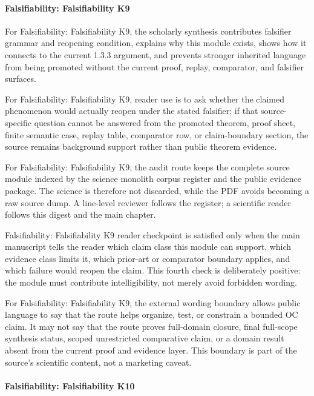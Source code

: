 \paragraph{Falsifiability: Falsifiability K9}

For Falsifiability: Falsifiability K9, the scholarly synthesis contributes falsifier grammar and reopening condition, explains why this module exists, shows how it connects to the current 1.3.3 argument, and prevents stronger inherited language from being promoted without the current proof, replay, comparator, and falsifier surfaces.


For Falsifiability: Falsifiability K9, reader use is to ask whether the claimed phenomenon would actually reopen under the stated falsifier; if that source-specific question cannot be answered from the promoted theorem, proof sheet, finite semantic case, replay table, comparator row, or claim-boundary section, the source remains background support rather than public theorem evidence.


For Falsifiability: Falsifiability K9, the audit route keeps the complete source module indexed by the science monolith corpus register and the public evidence package. The science is therefore not discarded, while the PDF avoids becoming a raw source dump. A line-level reviewer follows the register; a scientific reader follows this digest and the main chapter.


Falsifiability: Falsifiability K9 reader checkpoint is satisfied only when the main manuscript tells the reader which claim class this module can support, which evidence class limits it, which prior-art or comparator boundary applies, and which failure would reopen the claim. This fourth check is deliberately positive: the module must contribute intelligibility, not merely avoid forbidden wording.


For Falsifiability: Falsifiability K9, the external wording boundary allows public language to say that the route helps organize, test, or constrain a bounded OC claim. It may not say that the route proves full-domain closure, final full-scope synthesis status, scoped unrestricted comparative claim, or a domain result absent from the current proof and evidence layer. This boundary is part of the source's scientific content, not a marketing caveat.


\paragraph{Falsifiability: Falsifiability K10}


